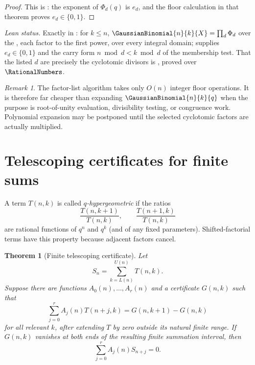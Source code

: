 \documentclass[11pt,a4paper,oneside,openany]{book}
\newtheorem{theorem}{Theorem}[chapter]
\theoremstyle{definition}
\theoremstyle{remark}
\newtheorem{remark}[remark]{Remark}
\begin{document}
\begin{proof}
This is : the exponent of $\Phi_d(q)$ is $e_d$, and the floor calculation in that theorem proves $e_d\in\{0,1\}$.
\end{proof}
\emph{Lean status.}  Exactly  in
: for \(k\le n\), \(\GaussianBinomial{n}{k}{X}=\prod_{d}\Phi_d\) over the
 , each factor to the first power, over every integral
domain;  supplies \(e_d\in\{0,1\}\) and
 the carry form \(n\bmod d<k\bmod d\) of the membership test.
That the listed \(d\) are precisely the cyclotomic divisors is
, proved over \(\RationalNumbers\).


\begin{remark}
The factor-list algorithm takes only $O(n)$ integer floor operations.  It is therefore far cheaper than expanding $\GaussianBinomial{n}{k}{q}$ when the purpose is root-of-unity evaluation, divisibility testing, or congruence work.  Polynomial expansion may be postponed until the selected cyclotomic factors are actually multiplied.
\end{remark}

\section{Telescoping certificates for finite sums}

A term $T(n,k)$ is called \emph{$q$-hypergeometric} if the ratios
\[
 \frac{T(n,k+1)}{T(n,k)},
 \qquad
 \frac{T(n+1,k)}{T(n,k)}
\]
are rational functions of $q^n$ and $q^k$ (and of any fixed parameters).  Shifted-factorial terms have this property because adjacent factors cancel.

\begin{theorem}[Finite telescoping certificate]\label{thm:telescoping-certificate}
Let
\[
 S_n=\sum_{k=L(n)}^{U(n)}T(n,k).
\]
Suppose there are functions $A_0(n),\ldots,A_r(n)$ and a certificate $G(n,k)$ such that
\[
 \sum_{j=0}^{r}A_j(n)T(n+j,k)
 =G(n,k+1)-G(n,k)
 \tag{20.1}\label{eq:certificate}
\]
for all relevant $k$, after extending $T$ by zero outside its natural finite range.  If $G(n,k)$ vanishes at both ends of the resulting finite summation interval, then
\[
 \sum_{j=0}^{r}A_j(n)S_{n+j}=0.
 \tag{20.2}\label{eq:certified-recurrence}
\]
\end{theorem}
\end{document}
